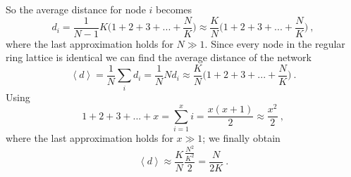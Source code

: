 \documentclass[11 pt , letterpaper , twoside , openright]{book}
\begin{document}
\newline
So the average distance for node $i$ becomes \cite{chap9}
\begin{equation}
	d_i = \frac{1}{N-1} K \bigg(1 + 2 + 3 + ... + \frac{N}{K} \bigg) \approx \frac{K}{N} \bigg(1 + 2 + 3 + ... + \frac{N}{K} \bigg) \ ,
\end{equation}
where the last approximation holds for $N \gg 1$. Since every node in the regular ring lattice is identical we can find the average distance of the network \cite{chap9}
\begin{equation}
	\left<d\right> = \frac{1}{N} \sum_i d_i = \frac{1}{N} N d_i \approx \frac{K}{N} \bigg(1 + 2 + 3 + ... + \frac{N}{K} \bigg) \ .
\end{equation}
Using \cite{chap9}
\begin{equation}
	1 + 2+ 3 +...+ x = \sum_{i = 1}^x i = \frac{x(x+1)}{2} \approx \frac{x^2}{2} \ ,
\end{equation}
where the last approximation holds for $x \gg 1$; we finally obtain \cite{chap9}
\begin{equation}
	\left<d\right> \approx \frac{K}{N} \frac{\frac{N^2}{K^2}}{2} = \frac{N}{2K} \ .
\end{equation}

\newpage
\backmatter

\pagestyle{plain}

\end{document}
